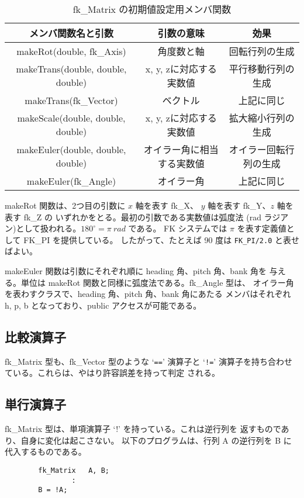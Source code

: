 \begin{table}[H]
\caption{fk\_Matrix の初期値設定用メンバ関数}
\label{tbl:fkMat1}
\begin{center}
\begin{tabular}{|c|c|c|}
\hline
メンバ関数名と引数 & 引数の意味 & 効果 \\ \hline \hline
makeRot(double, fk\_Axis) & 角度数と軸 &
        回転行列の生成 \\ \hline
makeTrans(double, double, double) &
        x, y, zに対応する実数値 & 平行移動行列の生成 \\ \hline
makeTrans(fk\_Vector) & ベクトル & 上記に同じ \\ \hline
makeScale(double, double, double) &
        x, y, zに対応する実数値 & 拡大縮小行列の生成 \\ \hline
makeEuler(double, double, double) & オイラー角に相当する実数値 &
        オイラー回転行列の生成 \\ \hline
makeEuler(fk\_Angle) & オイラー角 & 上記に同じ \\ \hline
\end{tabular}
\end{center}
\end{table}

makeRot 関数は、2つ目の引数に \(x\) 軸を表す fk\_X、
\(y\) 軸を表す fk\_Y、\(z\) 軸を表す fk\_Z の
いずれかをとる。最初の引数である実数値は弧度法
(rad ラジアン)として扱われる。\(180^\circ = \pi \: rad\) である。
FK システムでは \(\pi\) を表す定義値として FK\_PI を提供している。
したがって、たとえば 90 度は \verb+FK_PI/2.0+ と表せばよい。

makeEuler 関数は引数にそれぞれ順に heading 角、pitch 角、bank 角を
与える。単位は makeRot 関数と同様に弧度法である。fk\_Angle 型は、
オイラー角を表わすクラスで、heading 角、pitch 角、bank 角にあたる
メンバはそれぞれ h, p, b となっており、public アクセスが可能である。
\subsection{比較演算子}
fk\_Matrix 型も、fk\_Vector 型のような `\verb+==+' 演算子と `\verb+!=+'
演算子を持ち合わせている。これらは、やはり許容誤差を持って判定
される。
\subsection{単行演算子}
fk\_Matrix 型は、単項演算子 `!' を持っている。これは逆行列を
返すものであり、自身に変化は起こさない。
以下のプログラムは、行列 A の逆行列を B に代入するものである。
\\
\begin{screen}
\begin{verbatim}
        fk_Matrix   A, B;
                :
        B = !A;
\end{verbatim}
\end{screen}
